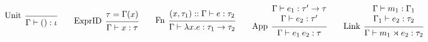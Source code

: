 \documentclass{article}
\theoremstyle{definition}
\newcommand*{\cons}{::}
\newcommand*{\link}[2]{{#1}\rtimes{#2}}
\begin{document}
\begin{figure}[h!]
	\footnotesize
	\begin{flushright}
	\end{flushright}
	\centering
	\vspace{0pt} %
	\[
		\begin{prooftree}
			\infer[left label=Unit]0{
			\Gamma\vdash():\iota
			}
		\end{prooftree}\qquad
		\begin{prooftree}
			\hypo{\tau=\Gamma(x)}
			\infer[left label=ExprID]1{
			\Gamma\vdash x:\tau
			}
		\end{prooftree}\qquad
		\begin{prooftree}
			\hypo{(x,\tau_1)\cons\Gamma\vdash e:\tau_2}
			\infer[left label=Fn]1{
			\Gamma\vdash\lambda x.e:\tau_1\rightarrow\tau_2
			}
		\end{prooftree}\qquad
		\begin{prooftree}
			\hypo{
				\begin{matrix}
					\Gamma\vdash e_1:\tau'\rightarrow\tau \\
					\Gamma\vdash e_2:\tau'
				\end{matrix}
			}
			\infer[left label={App}]1{
			\Gamma\vdash e_{1}\:e_{2}:\tau
			}
		\end{prooftree}\qquad
		\begin{prooftree}
			\hypo{
				\begin{matrix}
					\Gamma\vdash m_1:\Gamma_1 \\
					\Gamma_1\vdash e_2:\tau_2
				\end{matrix}
			}
			\infer[left label=Link]1{
			\Gamma\vdash\link{m_{1}}{e_{2}}:\tau_2
			}
		\end{prooftree}
	\]


\end{figure}
\end{document}

